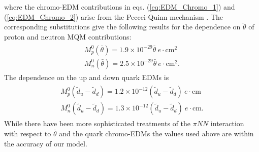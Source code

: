 \documentclass[10pt,a4paper, twoside]{report}
\begin{document}
where the chromo-EDM contributions in eqs. (\ref{eq:EDM_Chromo_1}) and (\ref{eq:EDM_Chromo_2}) arise from the Peccei-Quinn mechanism \cite{Peccei1977, Pospelov2005}. 
The corresponding substitutions give the following results for the dependence on $\tilde{\theta}$ of  proton and neutron MQM contributions:
\begin{align}
\begin{split}
M_{p}^0(\bar{\theta}) = 1.9 \times 10^{-29}\bar{\theta} \ e\cdot\text{cm}^2 \\
M_{n}^0(\bar{\theta}) = 2.5 \times 10^{-29}\bar{\theta} \ e\cdot\text{cm}^2.
\end{split}
\end{align}
The dependence  on the up and down quark EDMs is
\begin{align} 
\begin{split}
M_{p}^0(\tilde{d}_u - \tilde{d}_d) = 1.2 \times 10^{-12}(\tilde{d}_u - \tilde{d}_d) \ e\cdot\text{cm} \\
M_{n}^0(\tilde{d}_u - \tilde{d}_d) = 1.3 \times 10^{-12}(\tilde{d}_u - \tilde{d}_d) \ e\cdot\text{cm}. 
\end{split}
\end{align}
While there have been more sophisticated treatments of the  $\pi NN$ interaction with respect to $\bar{\theta}$\cite{Vries2015, Engel2013, Yamanaka2017, Chupp2018} and the quark chromo-EDMs \cite{Fuyuto2013, Seng2018, Engel2013, Yamanaka2017, Chupp2018} the values used above are within the accuracy of our model.  
\end{document}
